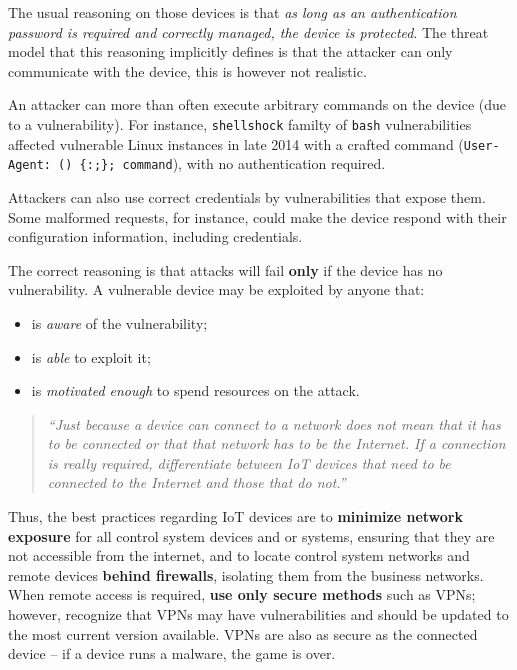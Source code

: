 \documentclass[10pt]{extbook}
\begin{document}
The usual reasoning on those devices is that \emph{as long as an authentication
password is required and correctly managed, the device is protected}. The
threat model that this reasoning implicitly defines is that the attacker can
only communicate with the device, this is however not realistic. 

An attacker
can more than often execute arbitrary commands on the device (due to a
vulnerability). For instance, \texttt{shellshock} familty of \texttt{bash}
vulnerabilities affected vulnerable Linux instances in late 2014 with a crafted
command (\texttt{User-Agent: () \{:;\}; command}), with no authentication
required. 

Attackers can also use correct credentials by vulnerabilities that expose them.
Some malformed requests, for instance, could make the device respond with their
configuration information, including credentials.

The correct reasoning is that attacks will fail \textbf{only} if the device has
no vulnerability. A vulnerable device may be exploited by anyone that:
\begin{itemize}
    \item is \emph{aware} of the vulnerability;
    \item is \emph{able} to exploit it;
    \item is \emph{motivated enough} to spend resources on the attack.
\end{itemize}

\begin{quote}
\emph{``Just because a device can connect to a network does not mean that it has to be
connected or that that network has to be the Internet. If a connection is
really required, differentiate between IoT devices that need to be connected to
the Internet and those that do not.''}
\end{quote}

Thus, the best practices regarding IoT devices are to \textbf{minimize network
exposure} for all control system devices and or systems, ensuring that they are
not accessible from the internet, and to locate control system networks and
remote devices \textbf{behind firewalls}, isolating them from the business
networks. When remote access is required, \textbf{use only secure methods} such
as VPNs; however, recognize that VPNs may have vulnerabilities and should be
updated to the most current version available. VPNs are also as secure as the
connected device -- if a device runs a malware, the game is over.
\end{document}
